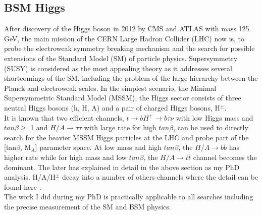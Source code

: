 \documentclass[12pt]{article}
\begin{document}
\subsection*{BSM Higgs}
After discovery of the Higgs boson in 2012 by CMS and ATLAS with mass 125 GeV, the main mission of the CERN Large Hadron Collider (LHC) now is, to probe the electroweak symmetry breaking mechanism and the search for possible extensions of the Standard Model (SM) of particle physics. Supersymmetry (SUSY) is considered as the most appealing theory as it addresses several shortcomings of the SM, including the problem of the large hierarchy between the Planck and electroweak scales. In the simplest scenario, the Minimal Supersymmetric Standard Model (MSSM), the Higgs sector consists of three neutral Higgs bosons (h, H, A) and a pair of charged Higgs bosons, H$^{\pm}$.\\
It is known that two efficient channels, $t\rightarrow bH^{+}\rightarrow b\tau\nu$ with low Higgs mass and $tan\beta \geq$ 1 and $H/A\rightarrow\tau\tau$ with large rate for high $tan\beta$, can be used to directly search for the heavier MSSM Higgs particles at the LHC and probe part of the [tan$\beta$, M$_{A}$] parameter space. At low mass and high $tan\beta$, the $H/A\rightarrow b\bar b$ has higher rate while for high mass and low $tan\beta$, the $H/A\rightarrow t\bar t$ channel becomes the dominant. The later has explained in detail in the above section as my PhD analysis. H/A/H$^{\pm}$ decay into a number of others channels where the detail can be found here \cite{third3}. \\
The work I did during my PhD is practically applicable to all searches including the precise measurement of the SM and BSM physics.  
\end{document}
